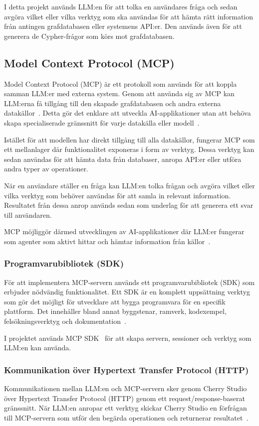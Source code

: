 I detta projekt används LLM:en för att tolka en användares fråga och sedan avgöra vilket eller vilka verktyg som ska användas för att hämta rätt information från antingen grafdatabasen eller systemens API:er.
Den används även för att generera de Cypher-frågor som körs mot grafdatabasen.

\subsection{Model Context Protocol (MCP)}\label{subsec:mcp_theory}
Model Context Protocol (MCP) är ett protokoll som används för att koppla samman LLM:er med externa system.
Genom att använda sig av MCP kan LLM:erna få tillgång till den skapade grafdatabasen och andra externa datakällor~\cite{13}.
Detta gör det enklare att utveckla AI-applikationer utan att behöva skapa specialiserade gränssnitt för varje datakälla eller modell~\cite{4}.

Istället för att modellen har direkt tillgång till alla datakällor, fungerar MCP som ett mellanlager där funktionalitet exponeras i form av verktyg.
Dessa verktyg kan sedan användas för att hämta data från databaser, anropa API:er eller utföra andra typer av operationer.

När en användare ställer en fråga kan LLM:en tolka frågan och avgöra vilket eller vilka verktyg som behöver användas för att samla in relevant information.
Resultatet från dessa anrop används sedan som underlag för att generera ett svar till användaren.

MCP möjliggör därmed utvecklingen av AI-applikationer där LLM:er fungerar som agenter som aktivt hittar och hämtar information från källor~\cite{4}.

\subsubsection{Programvarubibliotek (SDK)}
För att implementera MCP-servern används ett programvarubibliotek (SDK) som erbjuder nödvändig funktionalitet.
Ett SDK är en komplett uppsättning verktyg som gör det möjligt för utvecklare att bygga programvara för en specifik plattform.
Det innehåller bland annat byggstenar, ramverk, kodexempel, felsökningsverktyg och dokumentation~\cite{14}.

I projektet används MCP SDK~\cite{15} för att skapa servern, sessioner och verktyg som LLM:en kan använda.

\subsubsection{Kommunikation över Hypertext Transfer Protocol (HTTP)}
Kommunikationen mellan LLM:en och MCP-servern sker genom Cherry Studio över Hypertext Transfer Protocol (HTTP) genom ett request/response-baserat gränssnitt.
När LLM:en anropar ett verktyg skickar Cherry Studio en förfrågan till MCP-servern som utför den begärda operationen och returnerar resultatet~\cite{16}.

